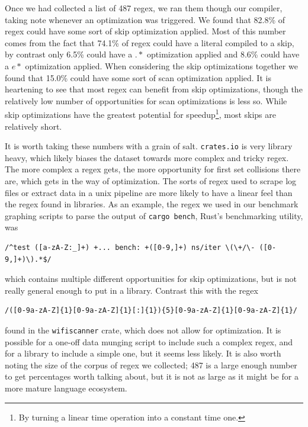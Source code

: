 Once we had collected
a list of 487 regex, we ran them though our compiler, taking
note whenever an optimization was triggered. We found that
82.8\% of regex could have some sort of skip optimization
applied. Most of this number comes from the fact that 74.1\% of
regex could have a literal compiled to a skip,
by contrast only 6.5\% could have a $.*$ optimization applied and 8.6\% could
have a $e*$ optimization applied. When considering the skip
optimizations together we found that 15.0\% could have some sort of
scan optimization applied. It is heartening to see that most regex
can benefit from skip optimizations, though the relatively low number
of opportunities for scan optimizations is less so. While skip
optimizations have the greatest potential for speedup\footnote{By turning
a linear time operation into a constant time one.}, most skips
are relatively short.

It is worth taking these numbers with a grain of salt. \verb'crates.io'
is very library heavy, which likely biases the dataset towards
more complex and tricky regex. The more complex a regex gets,
the more opportunity for first set collisions there are, which gets
in the way of optimization. The sorts
of regex used to scrape log files or extract data in a unix pipeline
are more likely to have a linear feel than the regex found in
libraries. As an example, the regex we used in our
benchmark graphing scripts to parse the output
of \texttt{cargo \allowbreak bench}, Rust's benchmarking utility, was

\begin{verbatim}
/^test ([a-zA-Z:_]+) +... bench: +([0-9,]+) ns/iter \(\+/\- ([0-9,]+)\).*$/
\end{verbatim}

\noindent
which contains multiple different opportunities for skip optimizations,
but is not really general enough to put in a library. Contrast this
with the regex

\begin{verbatim}
/([0-9a-zA-Z]{1}[0-9a-zA-Z]{1}[:]{1}){5}[0-9a-zA-Z]{1}[0-9a-zA-Z]{1}/
\end{verbatim}

\noindent
found in the \verb'wifiscanner' crate, which does not allow for
optimization. It is possible for a one-off data munging script to include
such a complex regex, and for a library to include a simple one, but
it seems less likely. It is also worth noting the size of the corpus of
regex we collected; 487 is a large enough number to get 
percentages worth talking about, but it is not as large as it might
be for a more mature language ecosystem.

